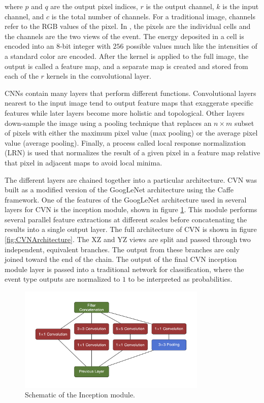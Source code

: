 \n where $p$ and $q$ are the output pixel indices, $r$ is the output channel, $k$ is the input channel, and $c$ is the total number of channels. For a traditional image, channels refer to the RGB values of the pixel. In \nova, the pixels are the individual cells and the channels are the two views of the event. The energy deposited in a cell is encoded into an $8$-bit integer with $256$ possible values much like the intensities of a standard color are encoded. After the kernel is applied to the full image, the output is called a feature map, and a separate map is created and stored from each of the $r$ kernels in the convolutional layer. 

CNNs contain many layers that perform different functions. Convolutional layers nearest to the input image tend to output feature maps that exaggerate specific features while later layers become more holistic and topological. Other layers down-sample the image using a pooling technique that replaces an $n\times m$ subset of pixels with either the maximum pixel value (max pooling) or the average pixel value (average pooling). Finally, a process called local response normalization (LRN) is used that normalizes the result of a given pixel in a feature map relative that pixel in adjacent maps to avoid local minima.

The different layers are chained together into a particular architecture. CVN was built as a modified version of the GoogLeNet \cite{ref:GoogLeNet} architecture using the Caffe \cite{ref:Caffe} framework. One of the features of the GoogLeNet architecture used in several layers for CVN is the inception module, shown in figure \ref{fig:CVNInception}. This module performs several parallel feature extractions at different scales before concatenating the results into a single output layer. The full architecture of CVN is shown in figure \ref{fig:CVNArchitecture}. The XZ and YZ views are split and passed through two independent, equivalent branches. The output from these branches are only joined toward the end of the chain. The output of the final CVN inception module layer is passed into a traditional network for classification, where the event type outputs are normalized to $1$ to be interpreted as probabilities.
\begin{figure}[htb]
  \centering
  \includegraphics[width=0.8\textwidth]{figures/CVN/Inception.png}
  \caption[Inception Module Schematic]{Schematic of the Inception module.}
  \label{fig:CVNInception}
\end{figure}

